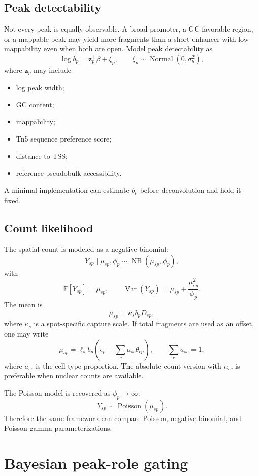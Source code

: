 \documentclass[11pt]{article}
\newcommand{\NB}{\operatorname{NB}}
\newcommand{\Pois}{\operatorname{Poisson}}
\newcommand{\Normal}{\operatorname{Normal}}
\newcommand{\E}{\mathbb{E}}
\newcommand{\Var}{\operatorname{Var}}
\begin{document}
\subsection{Peak detectability}

Not every peak is equally observable. A broad promoter, a GC-favorable region, or a mappable peak may yield more fragments than a short enhancer with low mappability even when both are open. Model peak detectability as
\[
\log b_p = \mathbf{z}_p^\top\beta + \xi_p,
\qquad
\xi_p\sim \Normal(0,\sigma_b^2),
\]
where $\mathbf{z}_p$ may include
\begin{itemize}
    \item log peak width;
    \item GC content;
    \item mappability;
    \item Tn5 sequence preference score;
    \item distance to TSS;
    \item reference pseudobulk accessibility.
\end{itemize}

A minimal implementation can estimate $b_p$ before deconvolution and hold it fixed.

\subsection{Count likelihood}

The spatial count is modeled as a negative binomial:
\[
Y_{sp} \mid \mu_{sp},\phi_p
\sim
\NB(\mu_{sp},\phi_p),
\]
with
\[
\E[Y_{sp}]=\mu_{sp},
\qquad
\Var(Y_{sp})=\mu_{sp}+\frac{\mu_{sp}^2}{\phi_p}.
\]
The mean is
\[
\mu_{sp}=\kappa_s b_p D_{sp},
\]
where $\kappa_s$ is a spot-specific capture scale. If total fragments are used as an offset, one may write
\[
\mu_{sp}=\ell_s b_p \left(\epsilon_p + \sum_c a_{sc}\theta_{cp}\right),
\qquad
\sum_c a_{sc}=1,
\]
where $a_{sc}$ is the cell-type proportion. The absolute-count version with $n_{sc}$ is preferable when nuclear counts are available.

The Poisson model is recovered as $\phi_p\rightarrow\infty$:
\[
Y_{sp}\sim\Pois(\mu_{sp}).
\]
Therefore the same framework can compare Poisson, negative-binomial, and Poisson-gamma parameterizations.

\section{Bayesian peak-role gating}
\end{document}

